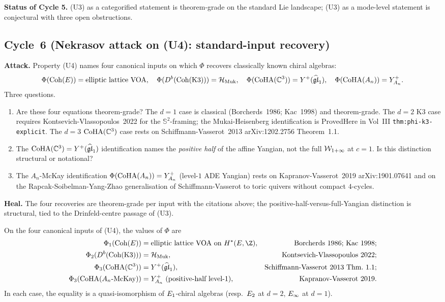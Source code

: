 \medskip
\noindent\textbf{Status of Cycle 5.} (U3) as a categorified statement
is theorem-grade on the standard Lie landscape; (U3) as a mode-level
statement is conjectural with three open obstructions.

\subsection*{Cycle~6 (Nekrasov attack on (U4): standard-input recovery)}

\textbf{Attack.} Property (U4) names four canonical inputs on which
$\Phi$ recovers classically known chiral algebras:
\[
  \Phi(\mathrm{Coh}(E)) = \text{elliptic lattice VOA},\quad
  \Phi(D^b(\mathrm{Coh}(\mathrm{K3}))) = \mathcal{H}_{\mathrm{Muk}},\quad
  \Phi(\mathrm{CoHA}(\mathbb{C}^3)) = Y^+(\widehat{\mathfrak{gl}}_1),\quad
  \Phi(\mathrm{CoHA}(A_n)) = Y^+_{A_n}.
\]
Three questions.
\begin{enumerate}
\item[Q1.] Are these four equations theorem-grade? The $d = 1$ case is
classical (Borcherds~1986; Kac~1998) and theorem-grade. The $d = 2$
K3 case requires Kontsevich-Vlassopoulos~2022 for the $\mathbb{S}^2$-framing;
the Mukai-Heisenberg identification is ProvedHere in
Vol~III \texttt{thm:phi-k3-explicit}. The $d = 3$ $\mathrm{CoHA}(\mathbb{C}^3)$ case
rests on Schiffmann-Vasserot~2013 arXiv:1202.2756 Theorem~1.1.
\item[Q2.] The $\mathrm{CoHA}(\mathbb{C}^3) = Y^+(\widehat{\mathfrak{gl}}_1)$ identification
names the \emph{positive half} of the affine Yangian, not the full
$\mathcal{W}_{1+\infty}$ at $c = 1$. Is this distinction structural or
notational?
\item[Q3.] The $A_n$-McKay identification
$\Phi(\mathrm{CoHA}(A_n)) = Y^+_{A_n}$ (level-$1$ ADE Yangian) rests on
Kapranov-Vasserot~2019 arXiv:1901.07641 and on the
Rapcak-Soibelman-Yang-Zhao generalisation of Schiffmann-Vasserot to
toric quivers without compact $4$-cycles.
\end{enumerate}

\textbf{Heal.} The four recoveries are theorem-grade per input with the
citations above; the positive-half-versus-full-Yangian distinction is
structural, tied to the Drinfeld-centre passage of (U3).

\begin{theorem}
\ClaimStatusTheorem\label{wn:thm:agent5-four-recoveries}
On the four canonical inputs of (U4), the values of $\Phi$ are
\begin{align*}
  \Phi_1(\Coh(E)) &= \text{elliptic lattice VOA on } H^*(E, \Z), & \text{Borcherds~1986; Kac~1998}; \\
  \Phi_2(D^b(\Coh(\mathrm{K3}))) &= \cH_{\mathrm{Muk}}, & \text{Kontsevich-Vlassopoulos~2022}; \\
  \Phi_3(\CoHA(\CC^3)) &= Y^+(\widehat{\fgl}_1), & \text{Schiffmann-Vasserot~2013 Thm.~1.1}; \\
  \Phi_3(\CoHA(A_n\text{-McKay})) &= Y^+_{A_n} \text{ (positive-half level-1)}, & \text{Kapranov-Vasserot~2019}.
\end{align*}
In each case, the equality is a quasi-isomorphism of $E_1$-chiral
algebras (resp.\ $E_2$ at $d = 2$, $E_\infty$ at $d = 1$).
\end{theorem}

